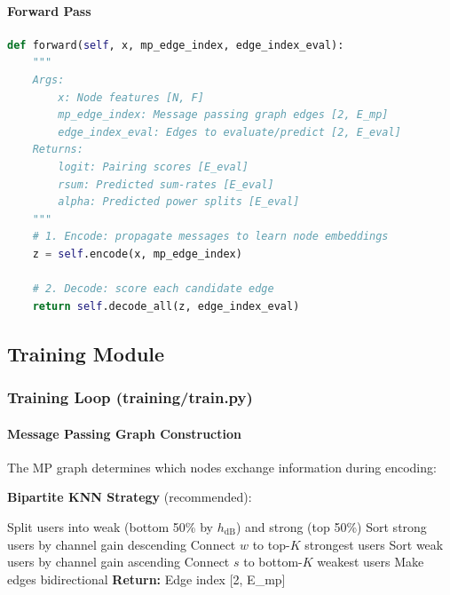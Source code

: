 \documentclass[12pt,a4paper]{article}
\begin{document}
\paragraph{Forward Pass}
\begin{lstlisting}[language=Python]
def forward(self, x, mp_edge_index, edge_index_eval):
    """
    Args:
        x: Node features [N, F]
        mp_edge_index: Message passing graph edges [2, E_mp]
        edge_index_eval: Edges to evaluate/predict [2, E_eval]
    Returns:
        logit: Pairing scores [E_eval]
        rsum: Predicted sum-rates [E_eval]
        alpha: Predicted power splits [E_eval]
    """
    # 1. Encode: propagate messages to learn node embeddings
    z = self.encode(x, mp_edge_index)
    
    # 2. Decode: score each candidate edge
    return self.decode_all(z, edge_index_eval)
\end{lstlisting}

\subsection{Training Module}

\subsubsection{Training Loop (training/train.py)}

\paragraph{Message Passing Graph Construction}

The MP graph determines which nodes exchange information during encoding:

\textbf{Bipartite KNN Strategy} (recommended):
\begin{algorithm}[H]
\caption{Build Bipartite KNN MP Graph}
\begin{algorithmic}[1]
\State Split users into weak (bottom 50\% by $h_{\text{dB}}$) and strong (top 50\%)
\State Sort strong users by channel gain descending
    \State Connect $w$ to top-$K$ strongest users
\EndFor
\State Sort weak users by channel gain ascending
    \State Connect $s$ to bottom-$K$ weakest users
\EndFor
\State Make edges bidirectional
\State \textbf{Return:} Edge index [2, E\_mp]
\end{algorithmic}
\end{algorithm}
\end{document}
